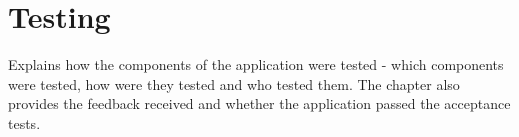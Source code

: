 \chapter{Testing}
Explains how the components of the application were tested - which components were tested, how were they tested and who tested them.
The chapter also provides the feedback received and whether the application passed the acceptance tests.